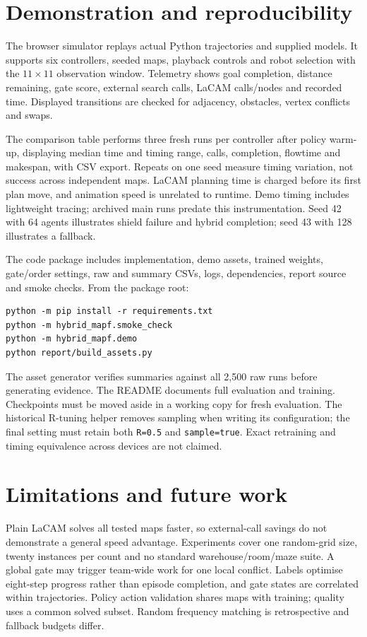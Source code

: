 \documentclass[10pt,a4paper]{article}
\begin{document}
\newpage
\section{Demonstration and reproducibility}
The browser simulator replays actual Python trajectories and supplied models. It supports six controllers, seeded maps, playback controls and robot selection with the $11\times11$ observation window. Telemetry shows goal completion, distance remaining, gate score, external search calls, LaCAM calls/nodes and recorded time. Displayed transitions are checked for adjacency, obstacles, vertex conflicts and swaps.

The comparison table performs three fresh runs per controller after policy warm-up, displaying median time and timing range, calls, completion, flowtime and makespan, with CSV export. Repeats on one seed measure timing variation, not success across independent maps. LaCAM planning time is charged before its first plan move, and animation speed is unrelated to runtime. Demo timing includes lightweight tracing; archived main runs predate this instrumentation. Seed 42 with 64 agents illustrates shield failure and hybrid completion; seed 43 with 128 illustrates a fallback.

The code package includes implementation, demo assets, trained weights, gate/order settings, raw and summary CSVs, logs, dependencies, report source and smoke checks. From the package root:
\begin{verbatim}
python -m pip install -r requirements.txt
python -m hybrid_mapf.smoke_check
python -m hybrid_mapf.demo
python report/build_assets.py
\end{verbatim}
The asset generator verifies summaries against all 2,500 raw runs before generating evidence. The README documents full evaluation and training. Checkpoints must be moved aside in a working copy for fresh evaluation. The historical R-tuning helper removes sampling when writing its configuration; the final setting must retain both \texttt{R=0.5} and \texttt{sample=true}. Exact retraining and timing equivalence across devices are not claimed.

\section{Limitations and future work}
Plain LaCAM solves all tested maps faster, so external-call savings do not demonstrate a general speed advantage. Experiments cover one random-grid size, twenty instances per count and no standard warehouse/room/maze suite. A global gate may trigger team-wide work for one local conflict. Labels optimise eight-step progress rather than episode completion, and gate states are correlated within trajectories. Policy action validation shares maps with training; quality uses a common solved subset. Random frequency matching is retrospective and fallback budgets differ.
\end{document}
